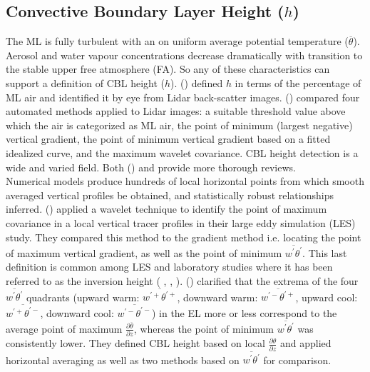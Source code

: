 \subsection{Convective Boundary Layer Height ($h$)}
\label{subsec:cblh}

The \acs{ML} is fully turbulent with an on uniform average potential temperature ($\overline{\theta}$). Aerosol and water vapour concentrations decrease dramatically with transition to the stable upper free atmosphere (\acs{FA}).  So any of these characteristics can support
a definition of \acs{CBL} height ($h$).  \citeauthor{StullNelEl} (\citeyear{StullNelEl}) defined $h$ in terms of the percentage of \acs{ML} air
and identified it by eye from Lidar back-scatter images.  \citeauthor{Traum11} (\citeyear{Traum11}) compared four automated methods applied to Lidar images: a suitable threshold value above which the air is categorized as \acs{ML} air,  the point of minimum (largest negative) vertical gradient, the point of minimum vertical gradient based on a fitted idealized curve, 
and the maximum wavelet covariance. \acs{CBL} height detection is a wide and varied field.  Both \citeauthor{BrooksFowler2} (\citeyear{BrooksFowler2}) and \citeauthor{Traum11} \citeyear{Traum11} provide more thorough reviews.\\

Numerical models produce hundreds of local horizontal points
from which smooth averaged vertical profiles be obtained, and statistically robust relationships inferred. \citeauthor{BrooksFowler2} (\citeyear{BrooksFowler2}) applied a wavelet technique to identify the point of maximum covariance in a local vertical tracer profiles in their large eddy simulation (\acs{LES}) study.  They compared this method to the gradient method i.e. locating the point of maximum vertical gradient, as well as the point of minimum $\overline{w^{'}\theta^{'}}$.  This last definition is common among \acs{LES} and laboratory studies where it has been referred to as the inversion height (\citeauthor{DearWill80} \citeyear{DearWill80}, \citeauthor{Sorbjan1} \citeyear{Sorbjan1}, \citeauthor{FedConzMir04} \citeyear{FedConzMir04}).  \citeauthor{SullMoengStev} (\citeyear{SullMoengStev}) clarified that the extrema of the four $\overline{w^{'}\theta^{'}}$ quadrants (upward warm: $\overline{w^{'+}\theta^{'+}}$, downward warm: $\overline{w^{'-}\theta^{'+}}$, upward cool: $\overline{w^{'+}\theta^{'-}}$, downward cool: $\overline{w^{'-}\theta^{'-}}$) in the \acs{EL} more or less correspond to the average point of maximum $\frac{\partial \overline{\theta}}{\partial z}$, whereas the point of minimum $\overline{w^{'}\theta^{'}}$ was consistently lower. They defined \acs{CBL} height based on local $\frac{\partial \theta}{\partial z}$ and applied horizontal averaging as well as two methods based on $\overline{w^{'}\theta^{'}}$
for comparison.\\


